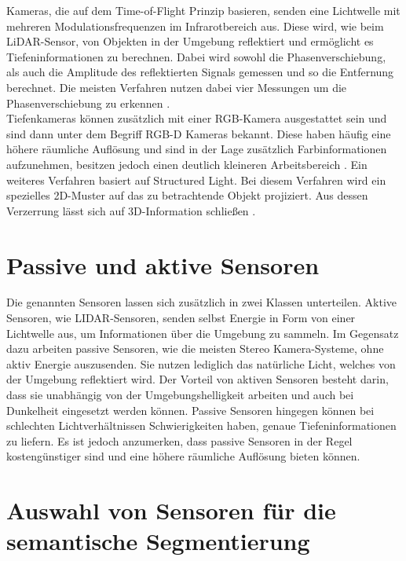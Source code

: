 Kameras, die auf dem Time-of-Flight Prinzip basieren, senden eine
Lichtwelle mit mehreren Modulationsfrequenzen im Infrarotbereich aus. Diese
wird, wie beim LiDAR-Sensor, von Objekten in der Umgebung reflektiert und
ermöglicht es Tiefeninformationen zu berechnen. Dabei wird sowohl die
Phasenverschiebung, als auch die Amplitude des reflektierten Signals gemessen
und so die Entfernung berechnet. Die meisten Verfahren nutzen dabei vier
Messungen um die Phasenverschiebung zu erkennen \cite{7035807,7025195}.
\\Tiefenkameras können zusätzlich mit einer RGB-Kamera ausgestattet sein und sind dann unter
dem Begriff RGB-D Kameras bekannt. Diese haben häufig eine höhere räumliche
Auflösung und sind in der Lage zusätzlich Farbinformationen aufzunehmen,
besitzen jedoch einen deutlich kleineren Arbeitsbereich \cite{9262651}. Ein
weiteres Verfahren basiert auf Structured Light. Bei diesem Verfahren wird ein
spezielles 2D-Muster auf das zu betrachtende Objekt projiziert. Aus dessen
Verzerrung lässt sich auf 3D-Information schließen \cite{7992709}.

\section{Passive und aktive Sensoren}
Die genannten Sensoren lassen sich zusätzlich in zwei Klassen unterteilen.
Aktive Sensoren, wie LIDAR-Sensoren, senden selbst Energie in Form von einer
Lichtwelle aus, um Informationen über die Umgebung zu sammeln. Im Gegensatz
dazu arbeiten passive Sensoren, wie die meisten Stereo Kamera-Systeme, ohne
aktiv Energie auszusenden. Sie nutzen lediglich das natürliche Licht, welches
von der Umgebung reflektiert wird. Der Vorteil von aktiven Sensoren besteht
darin, dass sie unabhängig von der Umgebungshelligkeit arbeiten und auch bei
Dunkelheit eingesetzt werden können. Passive Sensoren hingegen können bei
schlechten Lichtverhältnissen Schwierigkeiten haben, genaue Tiefeninformationen
zu liefern. Es ist jedoch anzumerken, dass passive Sensoren in der Regel
kostengünstiger sind und eine höhere räumliche Auflösung bieten können.
\cite{20222324}

\section{Auswahl von Sensoren für die semantische Segmentierung}


